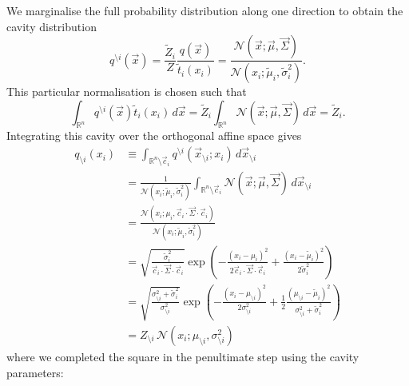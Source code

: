 \documentclass[11pt,twoside]{report}
\begin{document}
We marginalise the full probability distribution along one direction to obtain the cavity distribution
\begin{equation}
  q^{\setminus i}(\vec{x}) =
  \frac{\tilde{Z}_i}{Z} \frac{q(\vec{x})}{\tilde{t}_i(x_i)}
  =
  \frac
      {\mathcal{N}(\vec{x}; \vec{\mu}, \vec{\Sigma})}
      {\mathcal{N}(x_i; \tilde{\mu}_i, \tilde{\sigma}_i^2)}.
\end{equation}
This particular normalisation is chosen such that
\begin{equation}\label{eq:approximate-zeroth-moment}
  \int_{\mathbb{R}^n} q^{\setminus i}(\vec{x}) \tilde{t}_i(x_i) \, d\vec{x} =
  \tilde{Z}_i \int_{\mathbb{R}^n} \mathcal{N}(\vec{x}; \vec{\mu}, \vec{\Sigma}) \, d\vec{x} =
  \tilde{Z}_i.
\end{equation}
Integrating this cavity over the orthogonal affine space gives
\begin{equation}
  \begin{split}
    q_{\setminus i}(x_i) &\equiv
    \int_{\mathbb{R}^n \setminus \vec{c}_i} q^{\setminus i} (\vec{x}_{\setminus i}; x_i) \, d\vec{x}_{\setminus i} \\
    &= \frac{1}{\mathcal{N}(x_i; \tilde{\mu}_i, \tilde{\sigma}_i^2)}
    \int_{\mathbb{R}^n \setminus \vec{c}_i} \mathcal{N}(\vec{x}; \vec{\mu}, \vec{\Sigma}) \, d\vec{x}_{\setminus i} \\
    &=
    \frac
        {\mathcal{N}(x_i; \mu_i, \vec{c}_i \cdot \vec{\Sigma} \cdot \vec{c}_i)}
        {\mathcal{N}(x_i; \tilde{\mu}_i, \tilde{\sigma}_i^2)} \\
    &=
        \sqrt{ \frac{\tilde{\sigma}_i^2}{\vec{c}_i \cdot \vec{\Sigma} \cdot \vec{c}_i} }
        \exp{\left( -\frac{(x_i - \mu_i)^2}{2 \vec{c}_i \cdot \vec{\Sigma} \cdot \vec{c}_i} +
          \frac{(x_i - \tilde{\mu}_i)^2}{2 \tilde{\sigma}_i^2} \right)} \\
    &=
        \sqrt{ \frac{\sigma_{\setminus i}^2 + \tilde{\sigma}_i^2}{\sigma_{\setminus i}^2} }
        \exp{\left(
          - \frac{(x_i - \mu_{\setminus i})^2}{2 \sigma_{\setminus i}^2}
          + \frac{1}{2}
          \frac{(\mu_{\setminus i} - \tilde{\mu}_i)^2}{\sigma_{\setminus i}^2 + \tilde{\sigma}_i^2}
          \right)} \\
     &= Z_{\setminus i} \, \mathcal{N}(x_i; \mu_{\setminus i}, \sigma_{\setminus i}^2)
  \end{split}
\end{equation}
where we completed the square in the penultimate step using the cavity parameters: \cite{Rasmussen2006,Cunningham2011}
\end{document}
